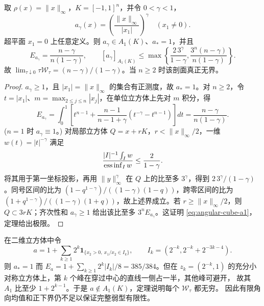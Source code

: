 \begin{proposition}\label{prop:unbounded-angular-cube}
取 $\rho(x)=\|x\|_\infty$，$K=[-1,1]^n$，并令 $0<\gamma<1$，
\[
 a_\gamma(x)=\left(\frac{\|x\|_\infty}{|x_1|}\right)^\gamma\quad(x_1\ne0).
\]
超平面 $x_1=0$ 上任意定义。则 $a_\gamma\in A_1(K)$、$a_*=1$，并且
\[
 E_{a_\gamma}=\frac{n-\gamma}{n(1-\gamma)},\qquad
 [a_\gamma]_{A_1(K)}\le
 \max\left\{\frac{2\,3^\gamma}{1-\gamma},
 \frac{3^n(n-\gamma)}{n(1-\gamma)}\right\}.\tag{SA.2}\label{eq:angular-cube-a1}
\]
故 $\lim_{\tau\downarrow0}\tau \mathcal W_\tau=(n-\gamma)/(1-\gamma)$。当 $n\ge2$ 时该剖面真正无界。
\end{proposition}

\begin{proof}
$a_\gamma\ge1$，且 $|x_1|=\|x\|_\infty$ 的集合有正测度，故 $a_*=1$。对 $n\ge2$，令
$t=|x_1|$、$m=\max_{2\le j\le n}|x_j|$，在单位立方体上先对 $m$ 积分，得
\[
 E_{a_\gamma}=\int_0^1\left[t^{n-1}+\frac{n-1}{n-1+\gamma}
 (t^{-\gamma}-t^{n-1})\right]dt=\frac{n-\gamma}{n(1-\gamma)}.
\]
($n=1$ 时 $a_\gamma\equiv1$。) 对局部立方体 $Q=x+rK$，$r<\|x\|_\infty/2$，一维
$w(t)=|t|^{-\gamma}$ 满足
\[
 \frac{|I|^{-1}\int_Iw}{\mathop{\rm ess\,inf}_Iw}\le\frac2{1-\gamma}.
\]
将其用于第一坐标投影，再用 $\|y\|_\infty^\gamma$ 在 $Q$ 上的比至多 $3^\gamma$，得到
$2\,3^\gamma/(1-\gamma)$。同号区间的比为
$(1-q^{1-\gamma})/((1-\gamma)(1-q))$，跨零区间的比为
$(1+q^{1-\gamma})/((1-\gamma)(1+q))$，故上述界成立。若
$r\ge\|x\|_\infty/2$，则 $Q\subset3rK$；齐次性和 $a_\gamma\ge1$ 给出该比至多
$3^nE_{a_\gamma}$。这证明 \eqref{eq:angular-cube-a1}，定理给出极限。
\end{proof}

\begin{remark}\label{rem:angular-spike-failure}
在二维立方体中令
\[
 a=1+\sum_{k\ge1}2^k\mathbf1_{\{x_2>0,\ x_1/x_2\in I_k\}},
 \qquad I_k=(2^{-k},2^{-k}+2^{-3k-4}).
\]
则 $a_*=1$ 而 $E_a=1+\sum_{k\ge1}2^k|I_k|/8=385/384$。但在
$z_k=(2^{-k},1)$ 的充分小对称立方体上，第 $k$ 个峰在穿过中心的直线一侧占一半，其他峰可避开，
故其 $A_1$ 比至少 $1+2^{k-1}$。于是 $a\notin A_1(K)$，定理说明每个 $\mathcal W_\tau$ 都无穷。
因此有限角向均值和正下界仍不足以保证完整弱型有限性。
\end{remark}
